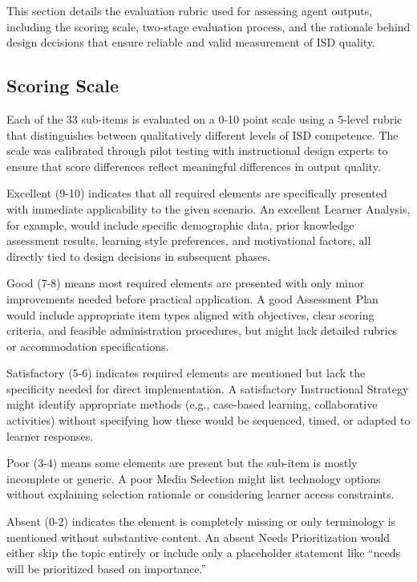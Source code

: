 This section details the evaluation rubric used for assessing agent outputs, including the scoring scale, two-stage evaluation process, and the rationale behind design decisions that ensure reliable and valid measurement of ISD quality.

\subsection{Scoring Scale}

Each of the 33 sub-items is evaluated on a 0-10 point scale using a 5-level rubric that distinguishes between qualitatively different levels of ISD competence. The scale was calibrated through pilot testing with instructional design experts to ensure that score differences reflect meaningful differences in output quality.

Excellent (9-10) indicates that all required elements are specifically presented with immediate applicability to the given scenario. An excellent Learner Analysis, for example, would include specific demographic data, prior knowledge assessment results, learning style preferences, and motivational factors, all directly tied to design decisions in subsequent phases.

Good (7-8) means most required elements are presented with only minor improvements needed before practical application. A good Assessment Plan would include appropriate item types aligned with objectives, clear scoring criteria, and feasible administration procedures, but might lack detailed rubrics or accommodation specifications.

Satisfactory (5-6) indicates required elements are mentioned but lack the specificity needed for direct implementation. A satisfactory Instructional Strategy might identify appropriate methods (e.g., case-based learning, collaborative activities) without specifying how these would be sequenced, timed, or adapted to learner responses.

Poor (3-4) means some elements are present but the sub-item is mostly incomplete or generic. A poor Media Selection might list technology options without explaining selection rationale or considering learner access constraints.

Absent (0-2) indicates the element is completely missing or only terminology is mentioned without substantive content. An absent Needs Prioritization would either skip the topic entirely or include only a placeholder statement like ``needs will be prioritized based on importance.''

